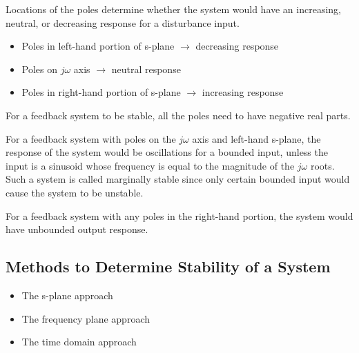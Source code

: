 \documentclass{article}
\begin{document}
    Locations of the poles determine whether the system would have an increasing, neutral, or decreasing response for a disturbance input.
    \begin{itemize}
        \item Poles in left-hand portion of s-plane $\rightarrow$ decreasing response
        \item Poles on $j\omega$ axis $\rightarrow$ neutral response
        \item Poles in right-hand portion of s-plane $\rightarrow$ increasing response
    \end{itemize}

    For a feedback system to be stable, all the poles need to have negative real parts.

    For a feedback system with poles on the $j\omega$ axis and left-hand s-plane, the response of the 
    system would be oscillations for a bounded input, unless the input is a sinusoid whose frequency is equal to the 
    magnitude of the $j\omega$ roots. Such a system is called marginally stable since only 
    certain bounded input would cause the system to be unstable.

    For a feedback system with any poles in the right-hand portion, the system would have unbounded output response.

    \subsection*{Methods to Determine Stability of a System}
    \begin{itemize}
        \item The s-plane approach
        \item The frequency plane approach
        \item The time domain approach
    \end{itemize}
\end{document}
